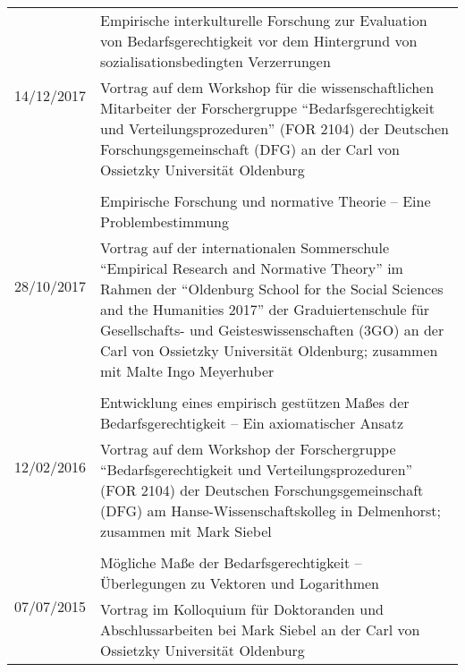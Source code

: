 \documentclass[a4paper,10pt]{article}
\begin{document}
\begin{longtable}{p{}p{}}
\\
\multirow{2}{1,75cm}{\footnotesize{14/12/2017}} & Empirische interkulturelle Forschung zur Evaluation von Bedarfsgerechtigkeit vor dem Hintergrund von sozialisationsbedingten Verzerrungen\\
& \footnotesize{Vortrag auf dem Workshop für die wissenschaftlichen Mitarbeiter der Forschergruppe \enquote{Bedarfsgerechtigkeit und Verteilungsprozeduren} (FOR 2104) der Deutschen Forschungsgemeinschaft (DFG) an der Carl von Ossietzky Universität Oldenburg}\\
\\
\multirow{2}{1,75cm}{\footnotesize{28/10/2017}} & Empirische Forschung und normative Theorie -- Eine Problembestimmung\\
& \footnotesize{Vortrag auf der internationalen Sommerschule \enquote{Empirical Research and Normative Theory} im Rahmen der \enquote{Oldenburg School for the Social Sciences and the Humanities 2017} der Graduiertenschule für Gesellschafts- und Geisteswissenschaften (3GO) an der Carl von Ossietzky Universität Oldenburg; zusammen mit Malte Ingo Meyerhuber}\\
\\
\multirow{2}{1,75cm}{\footnotesize{12/02/2016}} & Entwicklung eines empirisch gestützen Maßes der Bedarfsgerechtigkeit -- Ein axiomatischer Ansatz\\
& \footnotesize{Vortrag auf dem Workshop der Forschergruppe \enquote{Bedarfsgerechtigkeit und Verteilungsprozeduren} (FOR 2104) der Deutschen Forschungsgemeinschaft (DFG) am Hanse-Wissenschaftskolleg in Delmenhorst; zusammen mit Mark Siebel}\\
\\
\multirow{2}{1,75cm}{\footnotesize{07/07/2015}} & Mögliche Maße der Bedarfsgerechtigkeit -- Überlegungen zu Vektoren und Logarithmen\\
& \footnotesize{Vortrag im Kolloquium für Doktoranden und Abschlussarbeiten bei Mark Siebel an der Carl von Ossietzky Universität Oldenburg}\\
\end{longtable}


\end{document}
